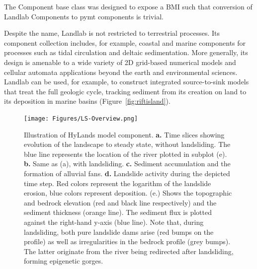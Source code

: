 \documentclass[12pt]{amsart}
\begin{document}
The Component base class was designed to expose a BMI such that conversion of Landlab Components to pymt components is trivial. 

Despite the name, Landlab is not restricted to terrestrial processes. Its component collection includes, for example, coastal and marine components for processes such as tidal circulation and deltaic sedimentation. More generally, its design is amenable to a wide variety of 2D grid-based numerical models and cellular automata applications beyond the earth and environmental sciences. Landlab can be used, for example, to construct integrated source-to-sink models that treat the full geologic cycle, tracking sediment from its creation on land to its deposition in marine basins (Figure~\ref{fig:riftisland}).

\begin{figure}
\texttt{[image: Figures/LS-Overview.png]}
\caption{Illustration of HyLands model component. \textbf{a.} Time slices showing evolution of the landscape to steady state, without landsliding. The blue line represents the location of the river plotted in subplot (e). \textbf{b.} Same as (a), with landsliding. \textbf{c.} Sediment accumulation and the formation of alluvial fans. \textbf{d.} Landslide activity during the depicted time step. Red colors represent the logarithm of the landslide erosion, blue colors represent deposition. (e.) Shows the topographic and bedrock elevation (red and black line respectively) and the sediment thickness (orange line). The sediment flux is plotted against the right-hand y-axis (blue line). Note that, during landsliding, both pure landslide dams arise (red bumps on the profile) as well as irregularities in the bedrock profile (grey bumps). The latter originate from the river being redirected after landsliding, forming epigenetic gorges.}
\label{fig:landslides}
\end{figure}
\end{document}
